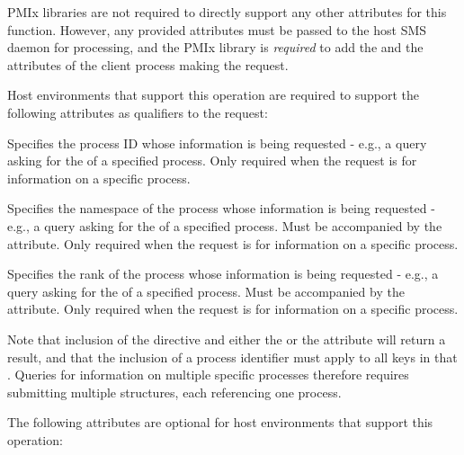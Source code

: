 \ac{PMIx} libraries are not required to directly support any other attributes for this function. However, any provided attributes must be passed to the host \ac{SMS} daemon for processing, and the \ac{PMIx} library is \textit{required} to add the  and the  attributes of the client process making the request.

\divider

Host environments that support this operation are required to support the following attributes as qualifiers to the request:

 Specifies the process ID whose information is being requested - e.g., a query asking for the  of a specified process. Only required when the request is for information on a specific process.
\pastePRIAttributeItemEnd

 Specifies the namespace of the process whose information is being requested - e.g., a query asking for the  of a specified process. Must be accompanied by the  attribute. Only required when the request is for information on a specific process.
\pastePRIAttributeItemEnd

 Specifies the rank of the process whose information is being requested - e.g., a query asking for the  of a specified process. Must be accompanied by the  attribute. Only required when the request is for information on a specific process.
\pastePRIAttributeItemEnd

Note that inclusion of the  directive and either the  or the  attribute will return a  result, and that the inclusion of a process identifier must apply to all keys in that . Queries for information on multiple specific processes therefore requires submitting multiple  structures, each referencing one process.

\optattrstart
The following attributes are optional for host environments that support this operation:

